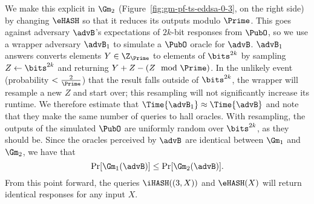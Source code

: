 	We make this explicit in $\Gm_2$ (Figure~\ref{fig:gm-pf-ts-eddsa-0-3}, on the right side) by changing $\eHASH$ so that it reduces its outputs modulo $\Prime$. 
	This goes against adversary $\advB$'s expectations of $2k$-bit responses from $\PubO$, so we use a wrapper adversary $\advB_1$ to simulate a $\PubO$ oracle for $\advB$. 
	$\advB_1$ answers converts elements $Y \in \Z_{\Prime}$ to elements of $\bits^{2k}$ by sampling $Z \gets \bits^{2k}$ and returning $Y + Z -(Z \mod \Prime)$. 
	In the unlikely event (probability $< \frac{2}{\Prime}$) that the result falls outside of $\bits^{2k}$, the wrapper will resample a new $Z$ and start over; this resampling will not significantly increase its runtime.
	We therefore estimate that $\Time{\advB_1} \approx \Time{\advB}$ and note that they make the same number of queries to hall oracles.
	With resampling, the outputs of the simulated $\PubO$ are uniformly random over $\bits^{2k}$, as they should be.
	Since the oracles perceived by $\advB$ are identical between $\Gm_1$ and $\Gm_2$, we have that
	\[\Pr[\Gm_1(\advB)] \leq \Pr[\Gm_2(\advB)].\]
	From this point forward, the queries $\iHASH((3,X))$ and $\eHASH(X)$ will return identical responses for any input $X$.
	

